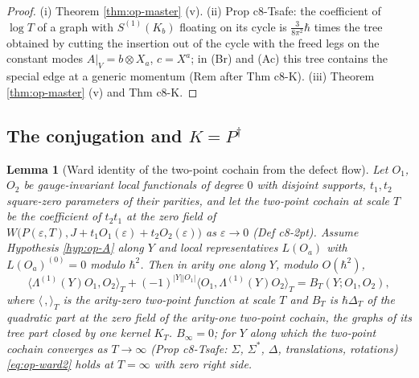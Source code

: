 \documentclass[11pt]{article}
\numberwithin{equation}{section}
\theoremstyle{plain}
\newtheorem{lemma}[theorem]{Lemma}
\theoremstyle{definition}
\newcommand{\AV}{A|_V}
\begin{document}
\begin{proof}
(i) Theorem \ref{thm:op-master} (v). (ii) Prop c8-Tsafe: the coefficient of $\log T$ of a graph with $S^{(1)}(K_b)$ floating on its cycle is $\tfrac3{8\pi^2}\hbar$ times the tree obtained by cutting the insertion out of the cycle with the freed legs on the constant modes $\AV=b\otimes X_a$, $c=X^a$; in (Br) and (Ac) this tree contains the special edge at a generic momentum (Rem after Thm c8-K). (iii) Theorem \ref{thm:op-master} (v) and Thm c8-K.
\end{proof}

\subsection{The conjugation and $K=P^\dagger$}

\begin{lemma}[Ward identity of the two-point cochain from the defect flow]
\label{lem:op-ward2}
Let $O_1$, $O_2$ be gauge-invariant local functionals of degree $0$ with disjoint supports, $t_1,t_2$ square-zero parameters of their parities, and let the two-point cochain at scale $T$ be the coefficient of $t_2t_1$ at the zero field of $W\big(P(\varepsilon,T),J+t_1O_1(\varepsilon)+t_2O_2(\varepsilon)\big)$ as $\varepsilon\to0$ (Def c8-2pt). Assume Hypothesis \ref{hyp:op-A} along $Y$ and local representatives $L(O_a)$ with $L(O_a)^{(0)}=0$ modulo $\hbar^2$. Then in arity one along $Y$, modulo $O(\hbar^2)$,
\begin{equation}
\big\langle\Lambda^{(1)}(Y)O_1,O_2\big\rangle_T+(-1)^{|Y||O_1|}\big\langle O_1,\Lambda^{(1)}(Y)O_2\big\rangle_T=B_T(Y;O_1,O_2),
\label{eq:op-ward2}
\end{equation}
where $\langle\,,\rangle_T$ is the arity-zero two-point function at scale $T$ and $B_T$ is $\hbar\Delta_T$ of the quadratic part at the zero field of the arity-one two-point cochain, the graphs of its tree part closed by one kernel $K_T$. $B_\infty=0$; for $Y$ along which the two-point cochain converges as $T\to\infty$ (Prop c8-Tsafe: $\Sigma$, $\Sigma^*$, $\Delta$, translations, rotations) \eqref{eq:op-ward2} holds at $T=\infty$ with zero right side.
\end{lemma}
\end{document}
